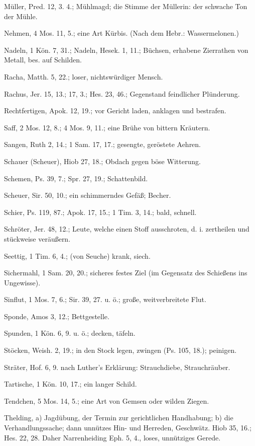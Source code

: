 Müller, Pred. 12, 3. 4.; Mühlmagd; die Stimme der Müllerin: der schwache Ton der Mühle.

Nehmen, 4 Mos. 11, 5.; eine Art Kürbis. (Nach dem Hebr.: Wassermelonen.)

Nadeln, 1 Kön. 7, 31.; Nadeln, Hesek. 1, 11.; Büchsen, erhabene Zierrathen von Metall, bes. auf Schilden.

Racha, Matth. 5, 22.; loser, nichtswürdiger Mensch.

Rachus, Jer. 15, 13.; 17, 3.; Hes. 23, 46.; Gegenstand feindlicher Plünderung.

Rechtfertigen, Apok. 12, 19.; vor Gericht laden, anklagen und bestrafen.

Saff, 2 Mos. 12, 8.; 4 Mos. 9, 11.; eine Brühe von bittern Kräutern.

Sangen, Ruth 2, 14.; 1 Sam. 17, 17.; gesengte, geröstete Aehren.

Schauer (Scheuer), Hiob 27, 18.; Obdach gegen böse Witterung.

Schemen, Ps. 39, 7.; Spr. 27, 19.; Schattenbild.

Scheuer, Sir. 50, 10.; ein schimmerndes Gefäß; Becher.

Schier, Ps. 119, 87.; Apok. 17, 15.; 1 Tim. 3, 14.; bald, schnell.

Schröter, Jer. 48, 12.; Leute, welche einen Stoff ausschroten, d. i. zertheilen und stückweise veräußern.

Seettig, 1 Tim. 6, 4.; (von Seuche) krank, siech.

Sichermahl, 1 Sam. 20, 20.; sicheres festes Ziel (im Gegensatz des Schießens ins Ungewisse).

Sinflut, 1 Mos. 7, 6.; Sir. 39, 27. u. ö.; große, weitverbreitete Flut.

Sponde, Amos 3, 12.; Bettgestelle.

Spunden, 1 Kön. 6, 9. u. ö.; decken, täfeln.

Stöcken, Weish. 2, 19.; in den Stock legen, zwingen (Ps. 105, 18.); peinigen.

Sträter, Hof. 6, 9. nach Luther's Erklärung: Strauchdiebe, Strauchräuber.

Tartische, 1 Kön. 10, 17.; ein langer Schild.

Tendchen, 5 Mos. 14, 5.; eine Art von Gemsen oder wilden Ziegen.

Thelding, a) Jagdübung, der Termin zur gerichtlichen Handhabung; b) die Verhandlungssache; dann unnützes Hin- und Herreden, Geschwätz. Hiob 35, 16.; Hes. 22, 28. Daher Narrenheiding Eph. 5, 4., loses, unnütziges Gerede.

